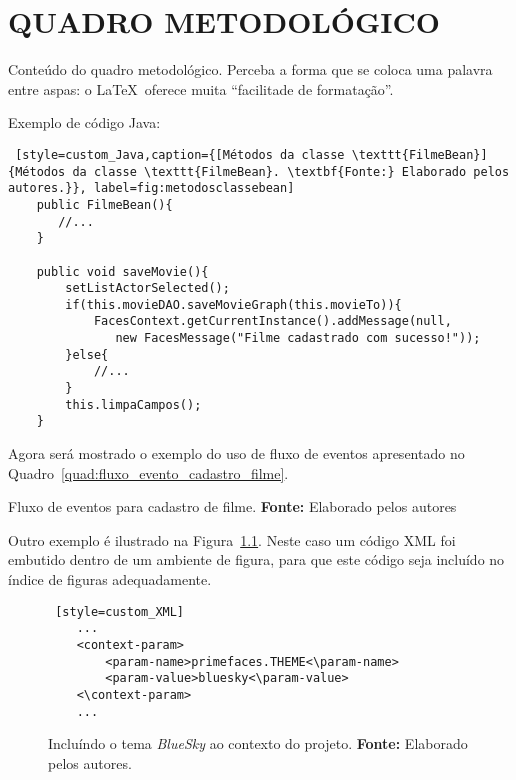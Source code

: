 
\chapter{QUADRO METODOLÓGICO}

\par Conteúdo do quadro metodológico. Perceba a forma que se coloca uma palavra entre aspas: o \LaTeX~oferece muita ``facilitade de formatação''.

Exemplo de código Java:

\begin{lstlisting} [style=custom_Java,caption={[Métodos da classe \texttt{FilmeBean}]{Métodos da classe \texttt{FilmeBean}. \textbf{Fonte:} Elaborado pelos autores.}}, label=fig:metodosclassebean] 	
	public FilmeBean(){  
       //...
   	}	
   	
	public void saveMovie(){
		setListActorSelected();		
		if(this.movieDAO.saveMovieGraph(this.movieTo)){
			FacesContext.getCurrentInstance().addMessage(null, 
			   new FacesMessage("Filme cadastrado com sucesso!")); 
		}else{
			//...
		}		
		this.limpaCampos();
	}
\end{lstlisting}

\par Agora será mostrado o exemplo do uso de fluxo de eventos apresentado no Quadro~\ref{quad:fluxo_evento_cadastro_filme}.

\begin{quadro}[h!]
  
  \caption[Fluxo de eventos para cadastro de filme]
           {Fluxo de eventos para cadastro de filme. \textbf{Fonte:} Elaborado pelos autores}
  \label{quad:fluxo_evento_cadastro_filme}
\end{quadro}

\par Outro exemplo é ilustrado na Figura~\ref{fig:bluesky}. Neste caso um código XML foi embutido dentro de um ambiente de figura, para que este código seja incluído no índice de figuras adequadamente.
 
\begin{figure}[ht!]
  \begin{lstlisting} [style=custom_XML]
	...
	<context-param>
		<param-name>primefaces.THEME<\param-name>
		<param-value>bluesky<\param-value>
	<\context-param>
	...
  \end{lstlisting}
  \caption[Incluindo o tema \textit{BlueSky} ao contexto do projeto]
          {Incluíndo o tema \textit{BlueSky} ao contexto do projeto. \textbf{Fonte:} Elaborado pelos autores.}
  \label{fig:bluesky}
\end{figure}
